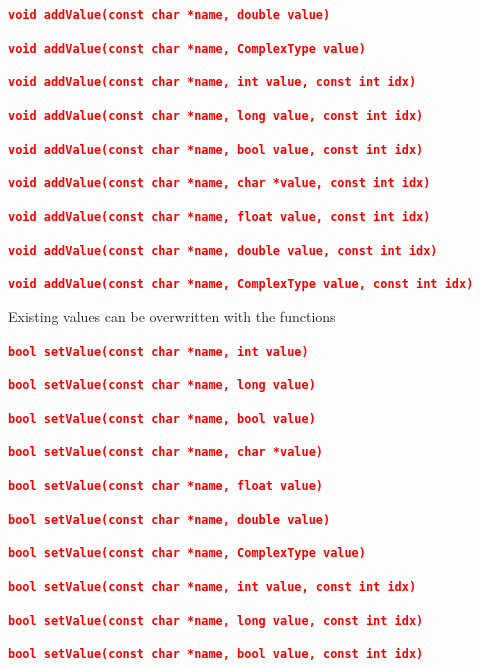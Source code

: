 \documentclass[12pt]{report} %
\begin{document}
\textcolor{red}{\texttt{\textbf{void addValue(const char *name, double value)}}}

\textcolor{red}{\texttt{\textbf{void addValue(const char *name, ComplexType value)}}}

\textcolor{red}{\texttt{\textbf{}}}

\textcolor{red}{\texttt{\textbf{void addValue(const char *name, int value, const int idx)}}}

\textcolor{red}{\texttt{\textbf{void addValue(const char *name, long value, const int idx)}}}

\textcolor{red}{\texttt{\textbf{void addValue(const char *name, bool value, const int idx)}}}

\textcolor{red}{\texttt{\textbf{void addValue(const char *name, char *value, const int idx)}}}

\textcolor{red}{\texttt{\textbf{void addValue(const char *name, float value, const int idx)}}}

\textcolor{red}{\texttt{\textbf{void addValue(const char *name, double value, const int idx)}}}

\textcolor{red}{\texttt{\textbf{void addValue(const char *name, ComplexType value, const int idx)}}}

Existing values can be overwritten with the functions

\textcolor{red}{\texttt{\textbf{bool setValue(const char *name, int value)}}}

\textcolor{red}{\texttt{\textbf{bool setValue(const char *name, long value)}}}

\textcolor{red}{\texttt{\textbf{bool setValue(const char *name, bool value)}}}

\textcolor{red}{\texttt{\textbf{bool setValue(const char *name, char *value)}}}

\textcolor{red}{\texttt{\textbf{bool setValue(const char *name, float value)}}}

\textcolor{red}{\texttt{\textbf{bool setValue(const char *name, double value)}}}

\textcolor{red}{\texttt{\textbf{bool setValue(const char *name, ComplexType value)}}}

\textcolor{red}{\texttt{\textbf{}}}

\textcolor{red}{\texttt{\textbf{bool setValue(const char *name, int value, const int idx)}}}

\textcolor{red}{\texttt{\textbf{bool setValue(const char *name, long value, const int idx)}}}

\textcolor{red}{\texttt{\textbf{bool setValue(const char *name, bool value, const int idx)}}}
\end{document}

